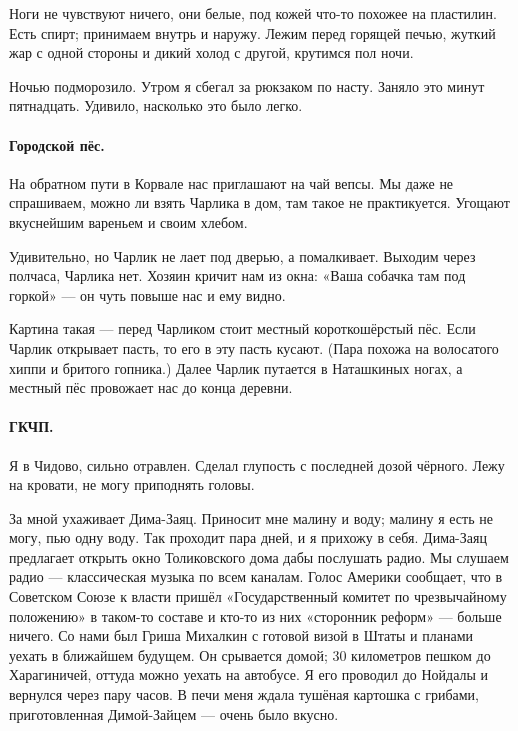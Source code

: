 \documentclass{book}
\begin{document}
Ноги не чувствуют ничего, они белые, под кожей что-то похожее на пластилин.
Есть спирт; принимаем внутрь и наружу.
Лежим перед горящей печью, жуткий жар с одной стороны и дикий холод с другой, крутимся пол ночи.

Ночью подморозило.
Утром я сбегал за рюкзаком по насту.
Заняло это минут пятнадцать.
Удивило, насколько это было легко.

\paragraph{Городской пёс.}

На обратном пути в Корвале нас приглашают на чай вепсы.
Мы даже не спрашиваем, можно ли взять Чарлика в дом, там такое не практикуется.
Угощают вкуснейшим вареньем и своим хлебом.

Удивительно, но Чарлик не лает под дверью, а помалкивает.
Выходим через полчаса, Чарлика нет.
Хозяин кричит нам из окна: «Ваша собачка там под горкой» --- он чуть повыше нас и ему видно.

Картина такая --- перед Чарликом стоит местный короткошёрстый пёс.
Если Чарлик открывает пасть, то его в эту пасть кусают.
(Пара похожа на волосатого хиппи и бритого гопника.)
Далее Чарлик путается в Наташкиных ногах, а местный пёс провожает нас до конца деревни.

\paragraph{ГКЧП.}

Я в Чидово, сильно отравлен.
Сделал глупость с последней дозой чёрного.
Лежу на кровати, не могу приподнять головы.

За мной ухаживает Дима-Заяц.
Приносит мне малину и воду; малину я есть не могу, пью одну воду.
Так проходит пара дней, и я прихожу в себя.
Дима-Заяц предлагает открыть окно Толиковского дома дабы послушать радио. 
Мы слушаем радио --- классическая музыка по всем каналам.
Голос Америки сообщает, что в Советском Союзе к власти пришёл «Государственный комитет по чрезвычайному положению» в таком-то составе и кто-то из них «сторонник реформ» --- больше ничего.
Со нами был Гриша Михалкин с готовой визой в Штаты и планами уехать в ближайшем будущем.
Он срывается домой;
30 километров пешком до Харагиничей, оттуда можно уехать на автобусе.
Я его проводил до Нойдалы и вернулся через пару часов.
В печи меня ждала тушёная картошка с грибами, приготовленная Димой-Зайцем  --- очень было вкусно.
\end{document}
